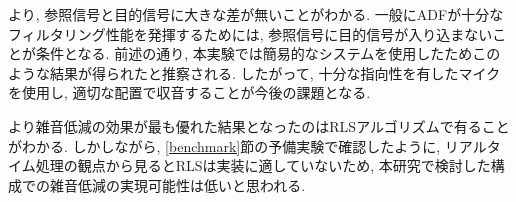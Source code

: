 より, 参照信号と目的信号に大きな差が無いことがわかる. 一般にADFが十分なフィルタリング性能を発揮するためには, 参照信号に目的信号が入り込まないことが条件となる. 前述の通り, 本実験では簡易的なシステムを使用したためこのような結果が得られたと推察される. したがって, 十分な指向性を有したマイクを使用し, 適切な配置で収音することが今後の課題となる. 

より雑音低減の効果が最も優れた結果となったのはRLSアルゴリズムで有ることがわかる. しかしながら, \ref{benchmark}節の予備実験で確認したように, リアルタイム処理の観点から見るとRLSは実装に適していないため, 本研究で検討した構成での雑音低減の実現可能性は低いと思われる. 